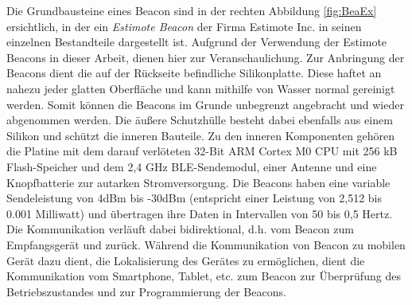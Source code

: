 Die Grundbausteine eines Beacon sind in der rechten Abbildung \ref{fig:BeaEx} ersichtlich, in der ein \textit{Estimote Beacon} der Firma Estimote Inc. in seinen einzelnen Bestandteile dargestellt ist. Aufgrund der Verwendung der Estimote Beacons in dieser Arbeit, dienen hier zur Veranschaulichung. Zur Anbringung der Beacons dient die auf der Rückseite befindliche Silikonplatte. Diese haftet an nahezu jeder glatten Oberfläche und kann mithilfe von Wasser normal gereinigt werden. Somit können die Beacons im Grunde unbegrenzt angebracht und wieder abgenommen werden. Die äußere Schutzhülle besteht dabei ebenfalls aus einem Silikon und schützt die inneren Bauteile. Zu den inneren Komponenten gehören die Platine mit dem darauf verlöteten 32-Bit ARM Cortex M0 CPU mit 256 kB Flash-Speicher und dem 2,4 GHz BLE-Sendemodul, einer Antenne und eine Knopfbatterie zur autarken Stromversorgung. Die Beacons haben eine variable Sendeleistung von 4dBm bis -30dBm (entspricht einer Leistung von 2,512 bis 0.001 Milliwatt) und übertragen ihre Daten in Intervallen von 50 bis 0,5 Hertz. Die Kommunikation verläuft dabei bidirektional, d.h. vom Beacon zum Empfangsgerät und zurück. Während die Kommunikation von Beacon zu mobilen Gerät dazu dient, die Lokalisierung des Gerätes zu ermöglichen, dient die Kommunikation vom Smartphone, Tablet, etc. zum Beacon zur Überprüfung des Betriebszustandes und zur Programmierung der Beacons. \\ \\
